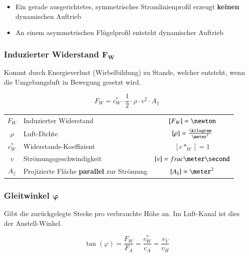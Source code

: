 \begin{itemize}
	\item Ein gerade ausgerichtetes, symmetrisches Stromlinienprofil erzeugt \textbf{keinen} dynamischen Auftrieb
	\item An einem asymmetrischen Flügelprofil entsteht dynamischer Auftrieb 
\end{itemize}


\subsubsection[Induzierter Widerstand]{Induzierter Widerstand $\bm{F_W}$}

Kommt durch Energieverlust (Wirbelbildung) zu Stande, welcher entsteht, wenn die Umgebungsluft in Bewegung gesetzt wird.

$$ \boxed{ F_W = c^*_W \cdot \frac{1}{2} \cdot \rho \cdot v^2 \cdot A_{\|} } $$


\begin{tabular}{c l c}
	$F_W$       & Induzierter Widerstand                            & $[F_W] = \newton$                     \\
	$\rho$      & Luft-Dichte                                       & $[\rho] = \frac{\kilogram}{\meter^3}$ \\
	$c^*_W$     & Widerstands-Koeffizient                           & $[c*_W] = 1$                          \\
	$v$         & Strömungsgeschwindigkeit                          & $[v] = frac{\meter}{\second}$         \\
	$A_{\|}$    & Projizierte Fläche \textbf{parallel} zur Strömung & $[A_{\|}] = \meter^2$
\end{tabular}

\subsubsection[Gleitwinkel]{Gleitwinkel $\bm{\varphi}$}

Gibt die zurückgelegte Stecke pro verbrauchte Höhe an. Im Luft-Kanal ist dies der Anstell-Winkel.

$$ \boxed{ \tan(\varphi) = \frac{F_W}{F_A} = \frac{c^*_W}{c_A}= \frac{v_V}{v_H} } $$

